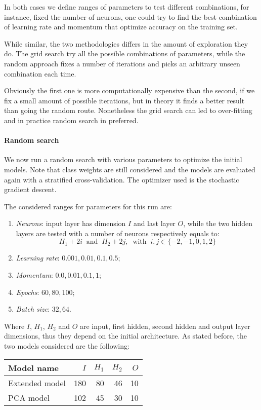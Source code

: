 In both cases we define ranges of parameters to test different combinations, 
for instance, fixed the number of neurons, one could try to find the best 
combination of learning rate and momentum that optimize accuracy on the training set.

While similar, the two methodologies differs in the amount of exploration they do.
The grid search try all the possible combinations of parameters, while the 
random approach fixes a number of iterations and picks an arbitrary unseen 
combination each time. 

Obviously the first one is more computationally expensive than the second, if 
we fix a small amount of possible iterations, but in theory it finds a better result
than going the random route. 
Nonetheless the grid search can led to over-fitting and in practice random 
search in preferred.

\paragraph{Random search}
We now run a random search with various parameters 
to optimize the initial models.
Note that class weights are still considered and the models are evaluated
again with a stratified cross-validation.
The optimizer used is the stochastic gradient descent.

The considered ranges for parameters for this run are: 
\begin{enumerate}
    \item \emph{Neurons}: input layer has dimension $I$ and last layer $O$, while 
    the two hidden layers are tested with a number of neurons respectively 
    equals to: 
    $$H_1 + 2i\;\;\text{and}\;\;H_2 + 2j,\;\;\text{with}\;\; i, j \in \{-2,-1,0,1,2\}$$
    \item \emph{Learning rate}: $0.001, 0.01, 0.1, 0.5$;
    \item \emph{Momentum}: $0.0, 0.01, 0.1, 1$;
    \item \emph{Epochs}: $60, 80, 100$;
    \item \emph{Batch size}: $32, 64$.
\end{enumerate}

Where $I$, $H_1$, $H_2$ and $O$ are input, first hidden, second hidden 
and output layer dimensions, thus they depend on the initial architecture.
As stated before, the two models considered are the following: 
\begin{center}
    \begin{tabular}{ |l|r|r|r|r|} 
        \hline
        Model name & $I$ & $H_1$ & $H_2$ & $O$ \\
        \hline
        Extended model & 180 & 80 & 46 & 10 \\
        PCA model & 102 & 45 & 30 & 10 \\
        \hline
    \end{tabular}
\end{center}

